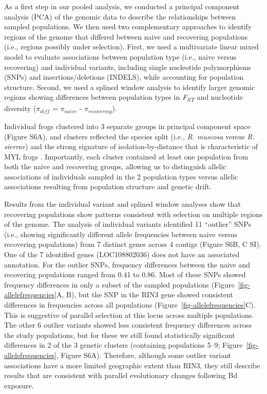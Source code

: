 \documentclass[9pt,twocolumn,twoside,lineno]{pnas-new}
\begin{document}
As a first step in our pooled analysis, we conducted a principal
component analysis (PCA) of the genomic data to describe the
relationships between sampled populations. We then used two
complementary approaches to identify regions of the genome that differed
between naive and recovering populations (i.e., regions possibly under
selection). First, we used a multivariate linear mixed model to evaluate
associations between population type (i.e., naive versus recovering) and
individual variants, including single nucleotide polymorphisms (SNPs)
and insertions/deletions (INDELS), while accounting for population
structure. Second, we used a splined window analysis to identify larger
genomic regions showing differences between population types in
\emph{F\textsubscript{ST}} and nucleotide diversity (\(\pi_{diff}\) =
\(\pi_{naive}\) - \(\pi_{recovering}\)).

Individual frogs clustered into 3 separate groups in principal component
space (Figure S6A), and clusters reflected
the species split (i.e., \emph{R. muscosa} versus \emph{R. sierrae}) and
the strong signature of isolation-by-distance that is characteristic of
MYL frogs \citep{rothstein2020, poorten2017, byrne2023}. Importantly,
each cluster contained at least one population from both the naive and
recovering groups, allowing us to distinguish allelic associations of
individuals sampled in the 2 population types versus allelic
associations resulting from population structure and genetic drift.

Results from the individual variant and splined window analyses show
that recovering populations show patterns consistent with selection on
multiple regions of the genome. The analysis of individual variants
identified 11 ``outlier'' SNPs (i.e., showing significantly different
allele frequencies between naive versus recovering populations) from 7
distinct genes across 4 contigs (Figure S6B, C
SI). One of the 7 identified genes (LOC108802036) does not have an
associated annotation. For the outlier SNPs, frequency differences
between the naive and recovering populations ranged from 0.41 to 0.86.
Most of these SNPs showed frequency differences in only a subset of the
sampled populations (Figure~\ref{fig-allelefrequencies}A, B), but the
SNP in the RIN3 gene showed consistent differences in frequencies across
all populations (Figure~\ref{fig-allelefrequencies}C). This is
suggestive of parallel selection at this locus across multiple
populations. The other 6 outlier variants showed less consistent
frequency differences across the study populations, but for these we
still found statistically significant differences in 2 of the 3 genetic
clusters (containing populations 5--9;
Figure~\ref{fig-allelefrequencies}, Figure S6A). Therefore, although some outlier variant associations have a more
limited geographic extent than RIN3, they still describe results that
are consistent with parallel evolutionary changes following Bd exposure.
\end{document}
